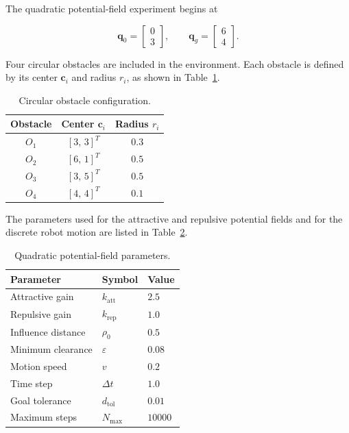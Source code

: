 \documentclass[10pt,twocolumn,a4paper]{article}
\begin{document}
The quadratic potential-field experiment begins at

\[
    \mathbf{q}_0
    =
    \begin{bmatrix}
        0 \\
        3
    \end{bmatrix},
    \qquad
    \mathbf{q}_g
    =
    \begin{bmatrix}
        6 \\
        4
    \end{bmatrix}.
\]

Four circular obstacles are included in the environment. Each obstacle
is defined by its center $\mathbf{c}_i$ and radius $r_i$, as shown in
Table~\ref{tab:obstacles}.

\begin{table}[htbp]
\centering
\caption{Circular obstacle configuration.}
\label{tab:obstacles}
\begin{tabular}{ccc}
\toprule
\textbf{Obstacle} &
\textbf{Center} $\mathbf{c}_i$ &
\textbf{Radius} $r_i$ \\
\midrule
$O_1$ & $[3,\,3]^T$ & $0.3$ \\
$O_2$ & $[6,\,1]^T$ & $0.5$ \\
$O_3$ & $[3,\,5]^T$ & $0.5$ \\
$O_4$ & $[4,\,4]^T$ & $0.1$ \\
\bottomrule
\end{tabular}
\end{table}

The parameters used for the attractive and repulsive potential fields
and for the discrete robot motion are listed in
Table~\ref{tab:parameters}.

\begin{table}[htbp]
\centering
\caption{Quadratic potential-field parameters.}
\label{tab:parameters}
\begin{tabular}{lll}
\toprule
\textbf{Parameter} &
\textbf{Symbol} &
\textbf{Value} \\
\midrule
Attractive gain &
$k_{\mathrm{att}}$ &
$2.5$ \\

Repulsive gain &
$k_{\mathrm{rep}}$ &
$1.0$ \\

Influence distance &
$\rho_0$ &
$0.5$ \\

Minimum clearance &
$\varepsilon$ &
$0.08$ \\

Motion speed &
$v$ &
$0.2$ \\

Time step &
$\Delta t$ &
$1.0$ \\

Goal tolerance &
$d_{\mathrm{tol}}$ &
$0.01$ \\

Maximum steps &
$N_{\max}$ &
$10000$ \\
\bottomrule
\end{tabular}
\end{table}
\end{document}
